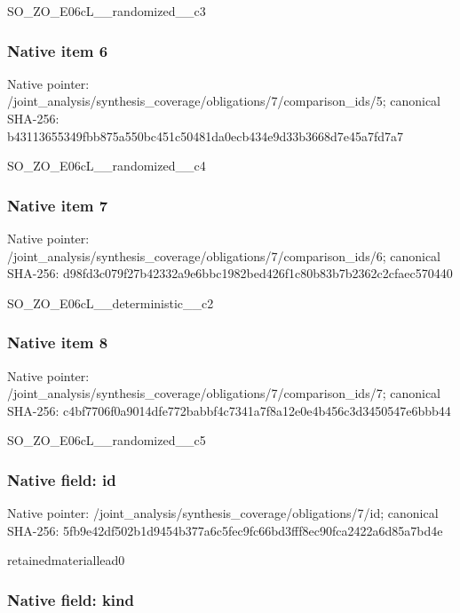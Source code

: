 \documentclass[10pt,a4paper]{article}
\begin{document}
SO\_ZO\_E06cL\_\_randomized\_\_c3


\subsubsection{Native item 6}


Native pointer: /joint\_analysis/synthesi\allowbreak{}s\_coverage/obligations/7\allowbreak{}/comparison\_ids/5; canonical SHA-256: b43113655349fbb875a550bc\allowbreak{}451c50481da0ecb434e9d33b\allowbreak{}3668d7e45a7fd7a7


SO\_ZO\_E06cL\_\_randomized\_\_c4


\subsubsection{Native item 7}


Native pointer: /joint\_analysis/synthesi\allowbreak{}s\_coverage/obligations/7\allowbreak{}/comparison\_ids/6; canonical SHA-256: d98fd3c079f27b42332a9e6b\allowbreak{}bc1982bed426f1c80b83b7b2\allowbreak{}362c2cfaec570440


SO\_ZO\_E06cL\_\_deterministic\_\_c2


\subsubsection{Native item 8}


Native pointer: /joint\_analysis/synthesi\allowbreak{}s\_coverage/obligations/7\allowbreak{}/comparison\_ids/7; canonical SHA-256: c4bf7706f0a9014dfe772bab\allowbreak{}bf4c7341a7f8a12e0e4b456c\allowbreak{}3d3450547e6bbb44


SO\_ZO\_E06cL\_\_randomized\_\_c5


\subsubsection{Native field: id}


Native pointer: /joint\_analysis/synthesi\allowbreak{}s\_coverage/obligations/7\allowbreak{}/id; canonical SHA-256: 5fb9e42df502b1d9454b377a\allowbreak{}6c5fec9fc66bd3fff8ec90fc\allowbreak{}a2422a6d85a7bd4e


retainedmateriallead0


\subsubsection{Native field: kind}
\end{document}
